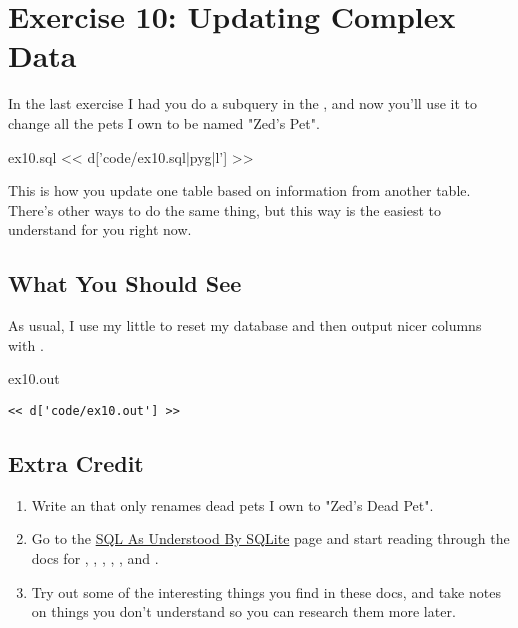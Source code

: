 \chapter{Exercise 10: Updating Complex Data}

In the last exercise I had you do a subquery in the , and now
you'll use it to change all the pets I own to be named "Zed's Pet".

\begin{code}{ex10.sql}
<< d['code/ex10.sql|pyg|l'] >>
\end{code}

This is how you update one table based on information from another table.
There's other ways to do the same thing, but this way is the easiest to
understand for you right now.

\section{What You Should See}

As usual, I use my little  to reset my database and then output
nicer columns with .

\begin{code}{ex10.out}
\begin{Verbatim}
<< d['code/ex10.out'] >>
\end{Verbatim}
\end{code}


\section{Extra Credit}

\begin{enumerate}
\item Write an  that only renames dead pets I own to "Zed's Dead Pet".
\item Go to the \href{http://www.sqlite.org/lang.html}{SQL As Understood By SQLite}
    page and start reading through the docs for , , , , , and .
\item Try out some of the interesting things you find in these docs, and take notes
    on things you don't understand so you can research them more later.
\end{enumerate}

